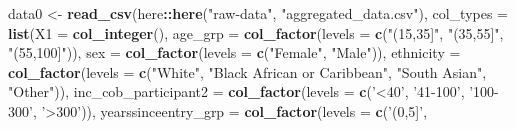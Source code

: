 \documentclass[]{article}
\newenvironment{Shaded}{\begin{snugshade}}{\end{snugshade}}
\newcommand{\DataTypeTok}[1]{\textcolor[rgb]{0.13,0.29,0.53}{#1}}
\newcommand{\KeywordTok}[1]{\textcolor[rgb]{0.13,0.29,0.53}{\textbf{#1}}}
\newcommand{\NormalTok}[1]{#1}
\newcommand{\OperatorTok}[1]{\textcolor[rgb]{0.81,0.36,0.00}{\textbf{#1}}}
\newcommand{\StringTok}[1]{\textcolor[rgb]{0.31,0.60,0.02}{#1}}
\begin{document}
\begin{Shaded}
\begin{Highlighting}[]
\NormalTok{data0 <-}\StringTok{ }\KeywordTok{read_csv}\NormalTok{(here}\OperatorTok{::}\KeywordTok{here}\NormalTok{(}\StringTok{"raw-data"}\NormalTok{, }\StringTok{"aggregated_data.csv"}\NormalTok{),}
                  \DataTypeTok{col_types =} \KeywordTok{list}\NormalTok{(}\DataTypeTok{X1 =} \KeywordTok{col_integer}\NormalTok{(),}
                                   \DataTypeTok{age_grp  =} \KeywordTok{col_factor}\NormalTok{(}\DataTypeTok{levels =}
                                                           \KeywordTok{c}\NormalTok{(}\StringTok{"(15,35]"}\NormalTok{,}
                                                             \StringTok{"(35,55]"}\NormalTok{,}
                                                             \StringTok{"(55,100]"}\NormalTok{)),}
                                   \DataTypeTok{sex  =} \KeywordTok{col_factor}\NormalTok{(}\DataTypeTok{levels =}
                                                       \KeywordTok{c}\NormalTok{(}\StringTok{"Female"}\NormalTok{,}
                                                         \StringTok{"Male"}\NormalTok{)),}
                                   \DataTypeTok{ethnicity  =} \KeywordTok{col_factor}\NormalTok{(}\DataTypeTok{levels =}
                                                             \KeywordTok{c}\NormalTok{(}\StringTok{"White"}\NormalTok{,}
                                                               \StringTok{"Black African or Caribbean"}\NormalTok{,}
                                                               \StringTok{"South Asian"}\NormalTok{,}
                                                               \StringTok{"Other"}\NormalTok{)),}
                                   \DataTypeTok{inc_cob_participant2 =} \KeywordTok{col_factor}\NormalTok{(}\DataTypeTok{levels =}
                                                                       \KeywordTok{c}\NormalTok{(}\StringTok{'<40'}\NormalTok{,}
                                                                         \StringTok{'41-100'}\NormalTok{,}
                                                                         \StringTok{'100-300'}\NormalTok{,}
                                                                         \StringTok{'>300'}\NormalTok{)),}
                                   \DataTypeTok{yearssinceentry_grp =} \KeywordTok{col_factor}\NormalTok{(}\DataTypeTok{levels =}
                                                                      \KeywordTok{c}\NormalTok{(}\StringTok{'(0,5]'}\NormalTok{,}

\end{Highlighting}
\end{Shaded}
\end{document}
